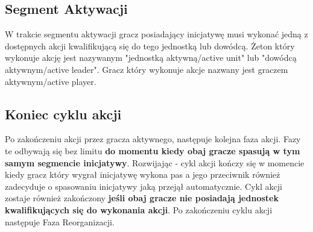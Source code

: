 \subsection{Segment Aktywacji}
W trakcie segmentu aktywacji gracz posiadający inicjatywę musi wykonać jedną z dostępnych akcji kwalifikującą się do tego jednostką lub dowódcą. Żeton który wykonuje akcję jest nazywanym "jednostką aktywną/active unit" lub "dowódcą aktywnym/active leader". Gracz który wykonuje akcje nazwany jest graczem aktywnym/active player.
\subsection{Koniec cyklu akcji}
Po zakończeniu akcji przez gracza aktywnego, następuje kolejna faza akcji. Fazy te odbywają się bez limitu \textbf{do momentu kiedy obaj gracze spasują w tym samym segmencie inicjatywy}. Rozwijając - cykl akcji kończy się w momencie kiedy gracz który wygrał inicjatywę wykona pas a jego przeciwnik również zadecyduje o spasowaniu inicjatywy jaką przejął automatycznie. Cykl akcji zostaje również zakończony \textbf{jeśli obaj gracze nie posiadają jednostek kwalifikujących się do wykonania akcji}. Po zakończeniu cyklu akcji następuje Faza Reorganizacji.

